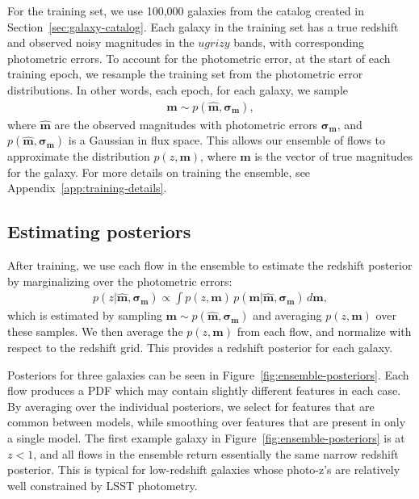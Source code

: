 \documentclass[twocolumn,twocolappendix]{aastex631}
\begin{document}
For the training set, we use 100,000 galaxies from the catalog created in Section~\ref{sec:galaxy-catalog}.
Each galaxy in the training set has a true redshift and observed noisy magnitudes in the $ugrizy$ bands, with corresponding photometric errors.
To account for the photometric error, at the start of each training epoch, we resample the training set from the photometric error distributions.
In other words, each epoch, for each galaxy, we sample
\begin{align}
    \mathbf{m} \sim p(\mathbf{\hat{m}}, \mathbf{\sigma_m}),
\end{align}
where $\mathbf{\hat{m}}$ are the observed magnitudes with photometric errors $\mathbf{\sigma_m}$, and $p(\mathbf{\hat{m}}, \mathbf{\sigma_m})$ is a Gaussian in flux space.
This allows our ensemble of flows to approximate the distribution $p(z, \mathbf{m})$, where $\mathbf{m}$ is the vector of true magnitudes for the galaxy.
For more details on training the ensemble, see Appendix~\ref{app:training-details}.


\subsection{Estimating posteriors}

After training, we use each flow in the ensemble to estimate the redshift posterior by marginalizing over the photometric errors:
\begin{align}
    p(z| \mathbf{\hat{m}}, \mathbf{\sigma_m}) \propto \int p(z, \mathbf{m}) \, p(\mathbf{m}| \mathbf{\hat{m}}, \mathbf{\sigma_m}) \, d\mathbf{m},
\end{align}
which is estimated by sampling $\mathbf{m} \sim p(\mathbf{\hat{m}}, \mathbf{\sigma_m})$ and averaging $p(z, \mathbf{m})$ over these samples.
We then average the $p(z, \mathbf{m})$ from each flow, and normalize with respect to the redshift grid.
This provides a redshift posterior for each galaxy.

Posteriors for three galaxies can be seen in Figure~\ref{fig:ensemble-posteriors}.
Each flow produces a PDF which may contain slightly different features in each case.
By averaging over the individual posteriors, we select for features that are common between models, while smoothing over features that are present in only a single model.
The first example galaxy in Figure~\ref{fig:ensemble-posteriors} is at $z < 1$, and all flows in the ensemble return essentially the same narrow redshift posterior.
This is typical for low-redshift galaxies whose photo-z's are relatively well constrained by LSST photometry.
\end{document}
